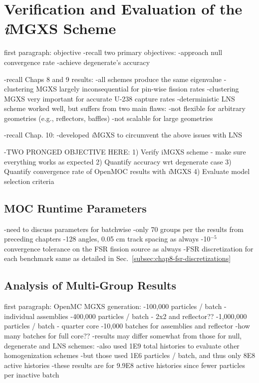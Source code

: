 \chapter{Verification and Evaluation of the \textit{i}MGXS Scheme}
\label{chap:results}

first paragraph: objective
-recall two primary objectives:
  -approach null convergence rate
  -achieve degenerate's accuracy

-recall Chaps 8 and 9 results:
  -all schemes produce the same eigenvalue
  -clustering MGXS largely inconsequential for pin-wise fission rates
  -clustering MGXS very important for accurate U-238 capture rates
  -deterministic LNS scheme worked well, but suffers from two main flaws:
    -not flexible for arbitrary geometries (e.g., reflectors, baffles)
    -not scalable for large geometries

-recall Chap. 10:
  -developed \textit{i}\ac{MGXS} to circumvent the above issues with LNS

-TWO PRONGED OBJECTIVE HERE:
  1) Verify iMGXS scheme - make sure everything works as expected
  2) Quantify accuracy wrt degenerate case
  3) Quantify convergence rate of OpenMOC results with \textit{i}\ac{MGXS} 
  4) Evaluate model selection criteria


\section{MOC Runtime Parameters}
\label{sec:chap11-moc-params}

-need to discuss parameters for batchwise 
-only 70 groups per the results from preceding chapters
-128 angles, 0.05 cm track spacing as always
-10$^{-5}$ convergence tolerance on the \ac{FSR} fission source as always
-FSR discretization for each benchmark same as detailed in Sec.~\ref{subsec:chap8-fsr-discretizations}

\section{Analysis of Multi-Group Results}
\label{subsec:chap11-imgxs-bias}

first paragraph: OpenMC MGXS generation:
-100,000 particles / batch - individual assemblies
-400,000 particles / batch - 2x2 and reflector??
-1,000,000 particles / batch - quarter core
-10,000 batches for assemblies and reflector
-how many batches for full core??
-results may differ somewhat from those for null, degenerate and LNS schemes:
  -also used 1E9 total histories to evaluate other homogenization schemes
  -but those used 1E6 particles / batch, and thus only 8E8 active histories
  -these results are for 9.9E8 active histories since fewer particles per inactive batch


